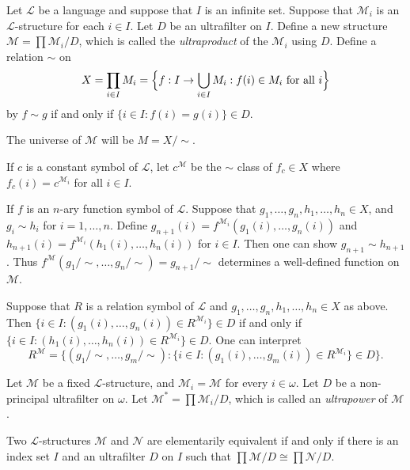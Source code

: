 \documentclass[
	fontsize=10pt, %
]{kaohandt}
\begin{document}
\begin{definition}[Ultraproducts]
    Let $\mathcal{L}$ be a language and suppose that $I$ is an infinite set.
    Suppose that $\mathcal{M}_i$ is an $\mathcal{L}$-structure for each $i \in I$.
    Let $D$ be an ultrafilter on $I$.
    Define a new structure $\mathcal{M} = \prod \mathcal{M}_i / D$,
    which is called the \emph{ultraproduct} of the $\mathcal{M}_i$ using $D$.
    Define a relation $\sim$ on 
    \[
    X = \prod_{i\in I}M_i = \Bigl\{ f: I \to \bigcup_{i\in I}M_i : f(i)\in M_i \text{ for all $i$} \Bigr\}
    \]
    by $f\sim g$ if and only if $\{i \in I:f(i) = g(i)\} \in D$.

    The universe of $\mathcal{M}$ will be $M = X / \sim$.
    
    If $c$ is a constant symbol of $\mathcal{L}$,
    let $c^{\mathcal{M}}$ be the $\sim$ class of $f_c \in X$ where $f_c(i) = c^{\mathcal{M}_i}$ for all $i\in I$. 

    If $f$ is an $n$-ary function symbol of $\mathcal{L}$.
    Suppose that $g_1,\dots,g_n,h_1,\dots,h_n\in X$,
    and $g_i \sim h_i$ for $i = 1, \dots,n$.
    Define $g_{n+1}(i) = f^{\mathcal{M}_i}(g_1(i),\dots,g_n(i))$ and 
    $h_{n+1}(i) = f^{\mathcal{M}_i}(h_1(i),\dots,h_n(i))$ for $i \in I$.
    Then one can show $g_{n+1} \sim h_{n+1}$.
    Thus $f^{\mathcal{M}}(g_1/\sim,\dots,g_n/\sim) = g_{n+1}/\sim$ determines a well-defined function on $\mathcal{M}$.

    Suppose that $R$ is a relation symbol of $\mathcal{L}$ and
    $g_1,\dots,g_n,h_1,\dots,h_n\in X$ as above.
    Then $\{i\in I: (g_1(i),\dots,g_n(i)) \in R^{\mathcal{M}_i}\} \in D$ if and only if $\{i \in I: (h_1(i),\dots,h_n(i)) \in R^{\mathcal{M}_i}\} \in D$.
    One can interpret
    \[
    R^{\mathcal{M}} = \{(g_1/\sim,\dots,g_m/\sim): \{ i\in I: (g_1(i),\dots,g_m(i)) \in R^{\mathcal{M}_i}\} \in D\}.
    \]
\end{definition}

\begin{definition}
    Let $\mathcal{M}$ be a fixed $\mathcal{L}$-structure,
    and $\mathcal{M}_i = \mathcal{M}$ for every $i \in \omega$.
    Let $D$ be a non-principal ultrafilter on $\omega$.
    Let $\mathcal{M}^* = \prod \mathcal{M}_i / D$,
    which is called an \emph{ultrapower} of $\mathcal{M}$.
\end{definition}

\begin{theorem}
    Two $\mathcal{L}$-structures $\mathcal{M}$ and $\mathcal{N}$ are elementarily equivalent if and only if there is an index set $I$ and an ultrafilter $D$ on $I$ such that $\prod \mathcal{M}/D \cong \prod \mathcal{N}/D$.
\end{theorem}
\end{document}
